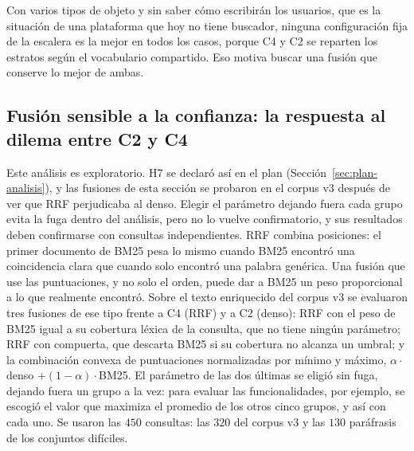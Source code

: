 \documentclass[11pt,letterpaper]{article}
\numberwithin{equation}{section}
\begin{document}
Con varios tipos de objeto y sin saber cómo escribirán los usuarios, que es la situación de una plataforma que hoy no tiene buscador, ninguna configuración fija de la escalera es la mejor en todos los casos, porque C4 y C2 se reparten los estratos según el vocabulario compartido. Eso motiva buscar una fusión que conserve lo mejor de ambas.

\subsection{Fusión sensible a la confianza: la respuesta al dilema entre C2 y C4}
\label{sec:res-v3-fusion}
Este análisis es exploratorio. H7 se declaró así en el plan (Sección~\ref{sec:plan-analisis}), y las fusiones de esta sección se probaron en el corpus v3 después de ver que RRF perjudicaba al denso. Elegir el parámetro dejando fuera cada grupo evita la fuga dentro del análisis, pero no lo vuelve confirmatorio, y sus resultados deben confirmarse con consultas independientes. RRF combina posiciones: el primer documento de BM25 pesa lo mismo cuando BM25 encontró una coincidencia clara que cuando solo encontró una palabra genérica. Una fusión que use las puntuaciones, y no solo el orden, puede dar a BM25 un peso proporcional a lo que realmente encontró. Sobre el texto enriquecido del corpus v3 se evaluaron tres fusiones de ese tipo frente a C4 (RRF) y a C2 (denso): RRF con el peso de BM25 igual a su cobertura léxica de la consulta, que no tiene ningún parámetro; RRF con compuerta, que descarta BM25 si su cobertura no alcanza un umbral; y la combinación convexa de puntuaciones normalizadas por mínimo y máximo, $\alpha\cdot$denso $+ (1-\alpha)\cdot$BM25. El parámetro de las dos últimas se eligió sin fuga, dejando fuera un grupo a la vez: para evaluar las funcionalidades, por ejemplo, se escogió el valor que maximiza el promedio de los otros cinco grupos, y así con cada uno. Se usaron las $450$ consultas: las $320$ del corpus v3 y las $130$ paráfrasis de los conjuntos difíciles.
\end{document}
